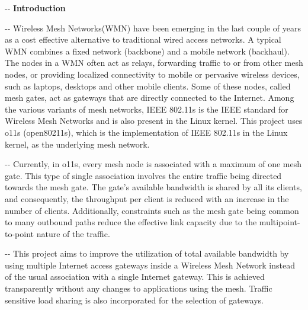\documentclass[12pt]{article}
\makeatletter
\newenvironment{indentation}[3]%
	{\par\setlength{\parindent}{#3}
	\setlength{\leftmargin}{#1}       \setlength{\rightmargin}{#1}%
	\advance\linewidth -\leftmargin       \advance\linewidth -\rightmargin%
	\advance\@totalleftmargin\leftmargin  \@setpar{{\@@par}}%
	\parshape 1\@totalleftmargin \linewidth\ignorespaces}{\par}%
\makeatother
\begin{document}
\pagebreak


\begin{indentation}{0pt}{0pt}{0pt}
\textbf{{{\Large Introduction}}}
\end{indentation}
\vspace{0.5cm}
\begin{indentation}{0pt}{0pt}{0pt}
{\normalsize \hspace{1cm} Wireless Mesh Networks(WMN) have been emerging in the last couple of years as a cost effective alternative to traditional wired access networks. A typical WMN combines a fixed network (backbone) and a mobile network (backhaul). The nodes in a WMN often act as relays, forwarding traffic to or from other mesh nodes, or providing localized connectivity to mobile or pervasive wireless devices, such as laptops, desktops and other mobile clients. Some of these nodes, called mesh gates, act as gateways that are directly connected to the Internet. Among the various variants of mesh networks, IEEE 802.11s is the IEEE standard for Wireless Mesh Networks and is also present in the Linux kernel. This project uses o11s (open80211s), which is the implementation of IEEE 802.11s in the Linux kernel, as the underlying mesh network.}
\end{indentation}

\begin{indentation}{0pt}{0pt}{0pt}
{\normalsize \hspace{1cm}Currently, in o11s, every mesh node is associated with a maximum of one mesh gate. This type of single association involves the entire traffic being directed towards the mesh gate. The gate's available bandwidth is shared by all its clients, and consequently, the throughput per client is reduced with an increase in the number of clients. Additionally, constraints such as the mesh gate being common to many outbound paths reduce the effective link capacity due to the multipoint-to-point nature of the traffic.}
\end{indentation}
\begin{indentation}{0pt}{0pt}{0pt}
{\normalsize \hspace{1cm}This project aims to improve the utilization of total available bandwidth by using multiple Internet access gateways inside a Wireless Mesh Network instead of the usual association with a single Internet gateway. This is achieved transparently without any changes to applications using the mesh. Traffic sensitive load sharing is also incorporated for the selection of gateways.}
\end{indentation}
\end{document}
